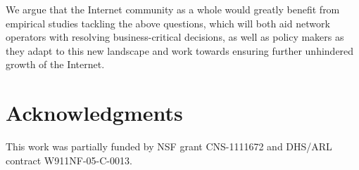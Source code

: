 \documentclass[letter]{sigcomm-alternate}
\begin{document}
We argue that the Internet community as a whole would greatly benefit from
empirical studies tackling the above questions, which will both aid network
operators with resolving business-critical decisions, as well as policy makers
as they adapt to this new landscape and work towards ensuring further
unhindered growth of the Internet. 

\section*{Acknowledgments}
\label{sec:acks}

This work was partially funded by NSF grant
CNS-1111672 and DHS/ARL contract W911NF-05-C-0013.



\end{document}
